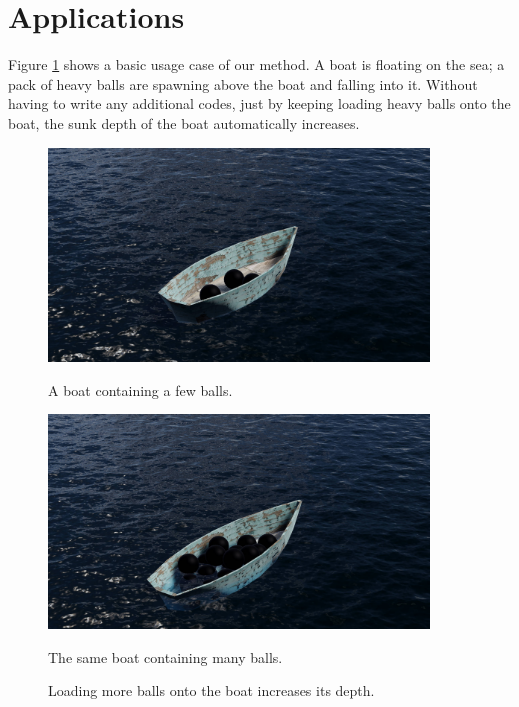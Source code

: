 \section{Applications}

Figure \ref{boat-sample} shows a basic usage case of our method.
A boat is floating on the sea; a pack of heavy balls are spawning above the boat and falling into it.
Without having to write any additional codes, just by keeping loading heavy balls onto the boat, the sunk depth of the boat automatically increases.

\begin{figure}[H]
	\centering
	\begin{subcaptionblock}{0.46\textwidth}
		\centering
		\includegraphics[width=0.9\textwidth]{../Thesis/figures/light-boat.jpg}
		\caption{A boat containing a few balls.}
	\end{subcaptionblock}
	\begin{subcaptionblock}{0.46\textwidth}
		\centering
		\includegraphics[width=0.9\textwidth]{../Thesis/figures/heavy-boat.jpg}
		\caption{The same boat containing many balls.}
	\end{subcaptionblock}
	\caption{Loading more balls onto the boat increases its depth.}
	\label{boat-sample}
\end{figure}


